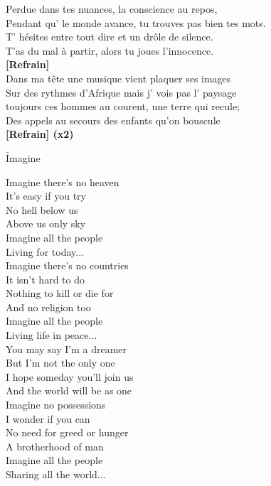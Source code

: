 \documentclass{novel}
\begin{document}
Perdue dans tes nuances, la conscience au repos,\\
Pendant qu' le monde avance, tu trouves pas bien tes mots.\\
T' hésites entre tout dire et un drôle de silence.\\
T'as du mal à partir, alors tu joues l'innocence.\\

\textbf{[Refrain]}\\

Dans ma tête une musique vient plaquer ses images\\
Sur des rythmes d'Afrique mais j' vois pas l' paysage\\
toujours ces hommes au courent, une terre qui recule;\\
Des appels au secours des enfants qu'on bouscule\\

\textbf{[Refrain] (x2)}

\newpage
\normalsize
\h*{Imagine}

Imagine there's no heaven\\
It's easy if you try\\
No hell below us\\
Above us only sky\\
Imagine all the people\\
Living for today...\\

Imagine there's no countries\\
It isn't hard to do\\
Nothing to kill or die for\\
And no religion too\\
Imagine all the people\\
Living life in peace...\\

You may say I'm a dreamer\\
But I'm not the only one\\
I hope someday you'll join us\\
And the world will be as one\\

Imagine no possessions\\
I wonder if you can\\
No need for greed or hunger\\
A brotherhood of man\\
Imagine all the people\\
Sharing all the world...\\
\end{document}
